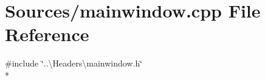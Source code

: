 \section{Sources/mainwindow.cpp File Reference}
\label{mainwindow_8cpp}
{\ttfamily \#include \char`\"{}..\textbackslash{}\+Headers\textbackslash{}mainwindow.\+h\char`\"{}}\\*
